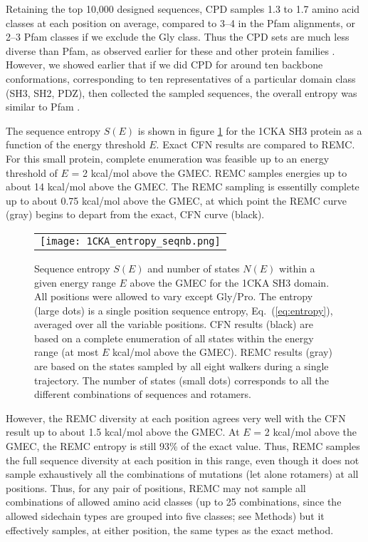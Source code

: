 Retaining the top 10,000 designed sequences, CPD samples 1.3 to 1.7 amino acid classes at each position on average, compared to 3--4 in the Pfam alignments, or 2--3 Pfam classes if we exclude the Gly class. Thus the CPD sets are much less diverse than Pfam, as observed earlier for these and other protein families \cite{Schmidt09,Schmidt10}. However, we showed earlier that if we did CPD for around ten backbone conformations, corresponding to ten representatives of a particular domain class (SH3, SH2, PDZ), then collected the sampled sequences, the overall entropy was similar to Pfam \cite{Schmidt09,Schmidt10}. 

The sequence entropy $S(E)$ is shown in figure \ref{fig:entropy} for the 1CKA SH3 protein as a function of the energy threshold $E$. Exact CFN results are compared to REMC. For this small protein, complete enumeration was feasible up to an energy threshold of $E$ = 2 kcal/mol above the GMEC. REMC samples energies up to about 14 kcal/mol above the GMEC. The REMC sampling is essentilly complete up to about 0.75 kcal/mol above the GMEC, at which point the REMC curve (gray) begins to depart from the exact, CFN curve (black).


    \begin{figure}[!htbp]
      \centering
      \begin{tabular}{c}
        \texttt{[image: 1CKA\_entropy\_seqnb.png]} 
      \end{tabular}

\caption[width=1cm]{\small 
Sequence entropy $S(E)$ and number of states $N(E)$ within a given energy range $E$ above the GMEC for the 1CKA SH3 domain. All positions were allowed to vary except Gly/Pro. The entropy (large dots) is a single position sequence entropy, Eq.\ (\ref{eq:entropy}), averaged over all the variable positions. CFN results (black) are based on a complete enumeration of all states within the energy range (at most $E$ kcal/mol above the GMEC). REMC results (gray) are based on the states sampled by all eight walkers during a single trajectory. The number of states (small dots) corresponds to all the different combinations of sequences and rotamers.
}
       \label{fig:entropy}
    \end{figure}




However, the REMC diversity at each position agrees very well with the CFN result up to about 1.5 kcal/mol above the GMEC. At $E$ = 2 kcal/mol above the GMEC, the REMC entropy is still 93\% of the exact value.
Thus, REMC samples the full sequence diversity at each position in this range, even though it does not sample exhaustively all the combinations of mutations (let alone rotamers) at all positions. Thus, for any pair of positions, REMC may not sample all combinations of allowed amino acid classes (up to 25 combinations, since the allowed sidechain types are grouped into five classes; see Methods) but it effectively samples, at either position, the same types as the exact method.

